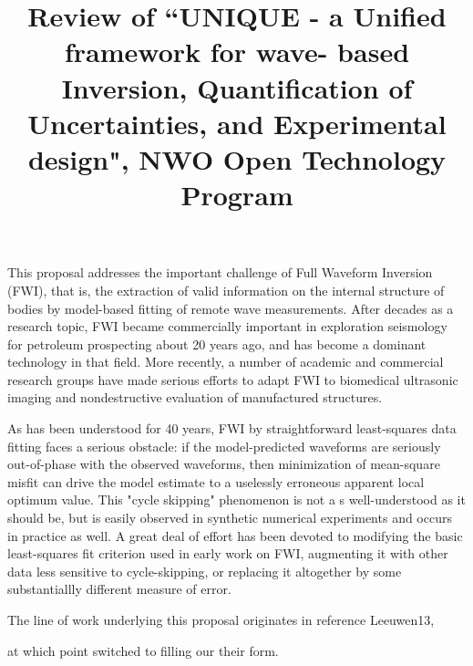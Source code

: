 \documentclass[12pt]{article}
\begin{document}
\title{Review of ``UNIQUE - a Unified framework for wave- based Inversion, Quantification of Uncertainties, and Experimental design", NWO Open Technology Program}
\date{}
\maketitle

This proposal addresses the important challenge of Full Waveform Inversion (FWI), that is, the extraction of valid information on the internal structure of bodies by model-based fitting of remote wave measurements. After decades as a research topic, FWI became commercially important in exploration seismology for petroleum prospecting about 20 years ago, and has become a dominant technology in that field. More recently, a number of academic and commercial research groups have made serious efforts to adapt FWI to biomedical ultrasonic imaging and nondestructive evaluation of manufactured structures.

As has been understood for 40 years, FWI by straightforward least-squares data fitting faces a serious obstacle: if the model-predicted waveforms are seriously out-of-phase with the observed waveforms, then minimization of mean-square misfit can drive the model estimate to a uselessly erroneous apparent local optimum value. This "cycle skipping" phenomenon is not a s well-understood as it should be, but is easily observed in synthetic numerical experiments and occurs in practice as well. A great deal of effort has been devoted to modifying the basic least-squares fit criterion used in early work on FWI, augmenting it with other data less sensitive to cycle-skipping, or replacing it altogether by some substantiallly different measure of error.

The line of work underlying this proposal originates in reference Leeuwen13,

at which point switched to filling our their form.
\end{document}

